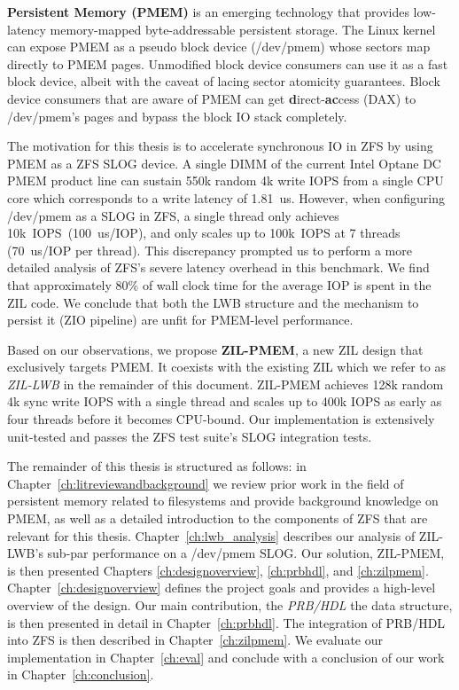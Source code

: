 \documentclass[12pt,a4paper,twoside]{book}
\begin{document}
\textbf{Persistent Memory (PMEM)} is an emerging technology that provides low-latency memory-mapped byte-addressable persistent storage.
The Linux kernel can expose PMEM as a pseudo block device (/dev/pmem) whose sectors map directly to PMEM pages.
Unmodified block device consumers can use it as a fast block device, albeit with the caveat of lacing sector atomicity guarantees.
Block device consumers that are aware of PMEM can get \textbf{d}irect-\textbf{ac}cess (DAX) to \mbox{/dev/pmem}'s pages and bypass the block IO stack completely.

The motivation for this thesis is to accelerate synchronous IO in ZFS by using PMEM as a ZFS SLOG device.
A single DIMM of the current Intel Optane DC PMEM product line can sustain 550k random 4k write IOPS from a single CPU core which corresponds to a write latency of 1.81~us.
However, when configuring /dev/pmem as a SLOG in ZFS, a single thread only achieves 10k~IOPS~(100~us/IOP), and only scales up to 100k~IOPS at 7 threads (70~us/IOP per thread).
This discrepancy prompted us to perform a more detailed analysis of ZFS's severe latency overhead in this benchmark.
We find that approximately 80\% of wall clock time for the average IOP is spent in the ZIL code.
We conclude that both the LWB structure and the mechanism to persist it (ZIO pipeline) are unfit for PMEM-level performance.

Based on our observations, we propose \textbf{ZIL-PMEM}, a new ZIL design that exclusively targets PMEM.
It coexists with the existing ZIL which we refer to as \textit{ZIL-LWB} in the remainder of this document.
ZIL-PMEM achieves 128k random 4k sync write IOPS with a single thread and scales up to 400k IOPS as early as four threads before it becomes CPU-bound.
Our implementation is extensively unit-tested and passes the ZFS test suite's SLOG integration tests.

The remainder of this thesis is structured as follows:
in Chapter~\ref{ch:litreviewandbackground} we
 review prior work in the field of persistent memory related to filesystems and
 provide background knowledge on PMEM, as well as
 a detailed introduction to the components of ZFS that are relevant for this thesis.
Chapter~\ref{ch:lwb_analysis} describes our analysis of ZIL-LWB's sub-par performance on a /dev/pmem SLOG.
Our solution, \mbox{ZIL-PMEM}, is then presented Chapters \ref{ch:designoverview}, \ref{ch:prbhdl}, and \ref{ch:zilpmem}.
Chapter~\ref{ch:designoverview} defines the project goals and provides a high-level overview of the design.
Our main contribution, the \textit{PRB/HDL} the data structure, is then presented in detail in Chapter~\ref{ch:prbhdl}.
The integration of PRB/HDL into ZFS is then described in Chapter~\ref{ch:zilpmem}.
We evaluate our implementation in Chapter~\ref{ch:eval} and conclude with a conclusion of our work in Chapter~\ref{ch:conclusion}.
\end{document}
